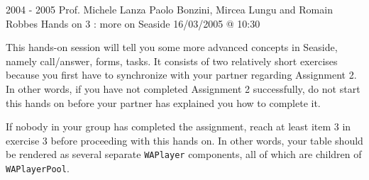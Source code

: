 \documentclass[a4paper,10pt]{scrartcl}
\begin{document}

	{2004 - 2005}
	{Prof. Michele Lanza}
	{Paolo Bonzini, Mircea Lungu and Romain Robbes}
	{Hands on 3 : more on Seaside}
	{16/03/2005 @ 10:30}


This hands-on session will tell you some more advanced concepts in
Seaside, namely call/answer, forms, tasks.  It consists of two relatively
short exercises because you first have to synchronize with your partner
regarding Assignment 2.  In other words, if you have not completed
Assignment 2 successfully, do not start this hands on before your partner
has explained you how to complete it.

If nobody in your group has completed the assignment, reach at least item
3 in exercise 3 before proceeding with this hands on.  In other words,
your table should be rendered as several separate \texttt{WAPlayer} components,
all of which are children of \texttt{WAPlayerPool}.
\end{document}
